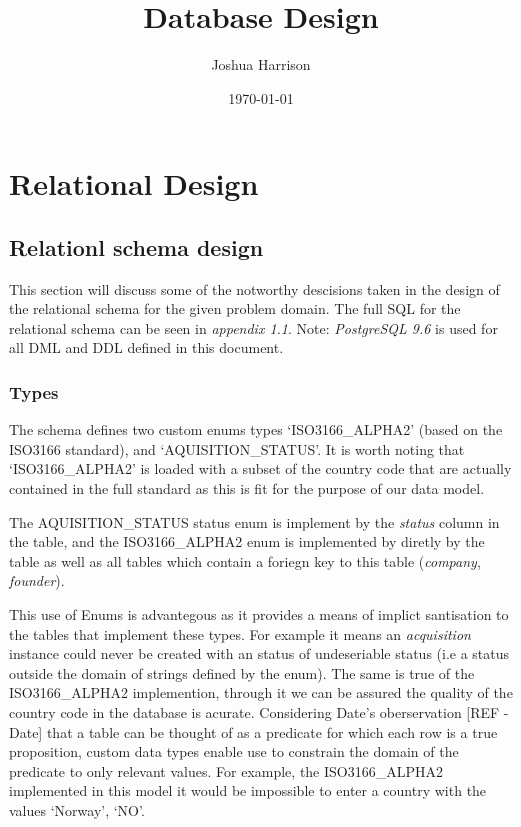 \documentclass[12pt]{article}
\title{Database Design}
\author{Joshua Harrison}
\date{\today}
\begin{document}
\maketitle

\section{Relational Design}

\subsection{Relationl schema design}
This section will discuss some of the notworthy descisions taken in the design of the relational schema for the given problem domain.
The full SQL for the relational schema can be seen in \emph{appendix 1.1}. Note: \emph{PostgreSQL 9.6} is used for all DML and DDL defined in this document.

\subsubsection{Types}
The schema defines two custom enums types  `ISO3166\_ALPHA2' (based on the ISO3166 standard), and `AQUISITION\_STATUS'. It is worth noting that `ISO3166\_ALPHA2' is loaded with a subset of the country code that are actually contained in the full standard as this is fit for the purpose of our data model.

The AQUISITION\_STATUS status enum is implement by the \emph{status} column in the  table, and the ISO3166\_ALPHA2 enum is implemented by diretly by the  table as well as all tables which contain a foriegn key to this table (\emph{company}, \emph{founder}).

This use of Enums is advantegous as it provides a means of implict santisation to the tables that implement these types. For example it means an \emph{acquisition} instance could never be created with an status of undeseriable status (i.e a status outside the domain of strings defined by the enum). The same is true of the ISO3166\_ALPHA2 implemention, through it we can be assured the quality of the country code in the database is acurate. Considering Date's  oberservation [REF - Date] that a table can be thought of as a predicate for which each row is a true proposition, custom data types enable use to constrain the domain of the predicate to only relevant values. For example, the ISO3166\_ALPHA2 implemented in this model it would be impossible to enter a country with the values `Norway', `NO'.
\end{document}
